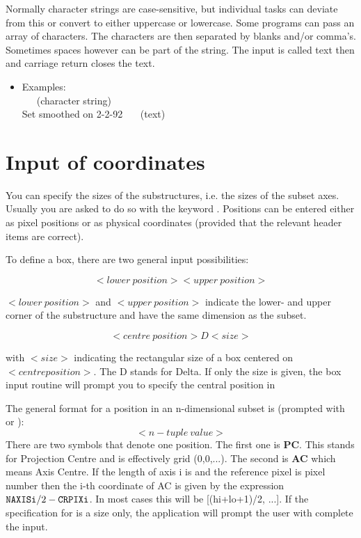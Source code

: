 Normally character strings are case-sensitive, but individual tasks can 
deviate from this or convert to either uppercase or lowercase. Some programs 
can pass an array of characters. The characters are then separated by blanks 
and/or comma's. Sometimes spaces however can be part of the string. The input 
is called text then and carriage return closes the text.
    
\begin{itemize}             
    \item Examples: \\
         \ \ \ (character string)\\
         Set smoothed on 2-2-92 \ \ \    (text)
\end{itemize}                   


\section{Input of coordinates}

You can specify the sizes of the substructures, i.e. the sizes of the subset 
axes. Usually you are asked to do so with the keyword . 
Positions can be 
entered either as pixel positions or as physical coordinates (provided that
the relevant header items are correct).

To define a box, there are two general input possibilities:

$$<lower\  position> <upper\ position>$$

$<lower\  position>$ and $<upper\  position>$ indicate the lower- and upper 
corner of the substructure and have the same dimension as the subset.
        
$$<centre\ position> D <size>$$

with $<size>$ indicating the rectangular size of a box centered
on $<centre position>$. The D stands for Delta.       
If only the size is given, the box input routine will prompt
you to specify the central position in 

The general format for a position in an n-dimensional subset is
(prompted with  or ):
$$ <n-tuple\  value>$$
There are two symbols that denote one position. The first one is {\bf PC}. 
This stands for Projection Centre and is effectively grid (0,0,...). 
The second is {\bf AC} which means Axis Centre. If the length of axis i is 
and the reference pixel is pixel number  then the i-th 
coordinate of 
AC is given by the expression ${\tt NAXISi}/2 - {\tt CRPIXi}$.
In most cases this will be [(hi+lo+1)/2, ...].
If the specification for  is a size only, the application
will prompt the user with  complete the input.


